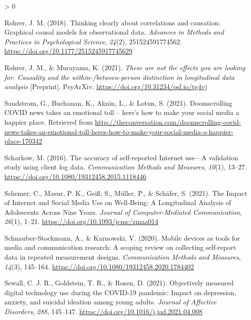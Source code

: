 \documentclass[
  english,
  man,floatsintext]{apa6}
\newlength{\cslhangindent}
\newenvironment{CSLReferences}[2] %
 {%
  \setlength{\parindent}{0pt}
  \ifodd #1 \everypar{\setlength{\hangindent}{\cslhangindent}}\ignorespaces\fi
  \ifnum #2 > 0
  \setlength{\parskip}{#2\baselineskip}
  \fi
 }%
 {}
\begin{document}
\begin{CSLReferences}{1}{0}
\leavevmode\hypertarget{ref-rohrerThinkingClearlyCorrelations2018}{}%
Rohrer, J. M. (2018). Thinking clearly about correlations and causation: {Graphical} causal models for observational data. \emph{Advances in Methods and Practices in Psychological Science}, \emph{24}(2), 251524591774562. \url{https://doi.org/10.1177/2515245917745629}

\leavevmode\hypertarget{ref-rohrerTheseAreNot2021}{}%
Rohrer, J. M., \& Murayama, K. (2021). \emph{These are not the effects you are looking for: {Causality} and the within-/between-person distinction in longitudinal data analysis} {[}Preprint{]}. PsyArXiv. \url{https://doi.org/10.31234/osf.io/tg4vj}

\leavevmode\hypertarget{ref-sandstromDoomscrollingCOVIDNews2021}{}%
Sandstrom, G., Buchanan, K., Aknin, L., \& Lotun, S. (2021). Doomscrolling {COVID} news takes an emotional toll -- here's how to make your social media a happier place. Retrieved from \url{http://theconversation.com/doomscrolling-covid-news-takes-an-emotional-toll-heres-how-to-make-your-social-media-a-happier-place-170342}

\leavevmode\hypertarget{ref-scharkowAccuracySelfreportedInternet2016}{}%
Scharkow, M. (2016). The accuracy of self-reported {Internet} use---{A} validation study using client log data. \emph{Communication Methods and Measures}, \emph{10}(1), 13--27. \url{https://doi.org/10.1080/19312458.2015.1118446}

\leavevmode\hypertarget{ref-schemerImpactInternetSocial2021}{}%
Schemer, C., Masur, P. K., Geiß, S., Müller, P., \& Schäfer, S. (2021). The {Impact} of {Internet} and {Social} {Media} {Use} on {Well}-{Being}: {A} {Longitudinal} {Analysis} of {Adolescents} {Across} {Nine} {Years}. \emph{Journal of Computer-Mediated Communication}, \emph{26}(1), 1--21. \url{https://doi.org/10.1093/jcmc/zmaa014}

\leavevmode\hypertarget{ref-schnauber-stockmannMobileDevicesTools2020}{}%
Schnauber-Stockmann, A., \& Karnowski, V. (2020). Mobile devices as tools for media and communication research: {A} scoping review on collecting self-report data in repeated measurement designs. \emph{Communication Methods and Measures}, \emph{14}(3), 145--164. \url{https://doi.org/10.1080/19312458.2020.1784402}

\leavevmode\hypertarget{ref-sewallObjectivelyMeasuredDigital2021}{}%
Sewall, C. J. R., Goldstein, T. R., \& Rosen, D. (2021). Objectively measured digital technology use during the {COVID}-19 pandemic: {Impact} on depression, anxiety, and suicidal ideation among young adults. \emph{Journal of Affective Disorders}, \emph{288}, 145--147. \url{https://doi.org/10.1016/j.jad.2021.04.008}


\end{CSLReferences}
\end{document}

